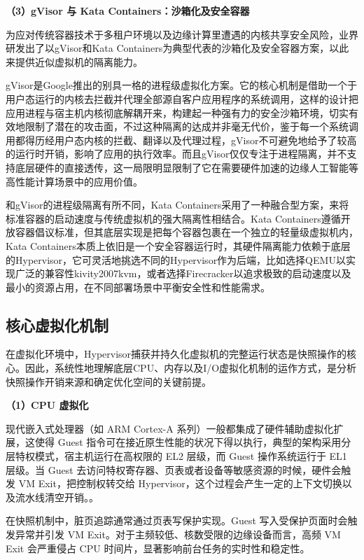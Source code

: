 \textbf{（3）gVisor 与 Kata Containers：沙箱化及安全容器}

为应对传统容器技术于多租户环境以及边缘计算里遭遇的内核共享安全风险，业界研发出了以gVisor和Kata Containers为典型代表的沙箱化及安全容器方案，以此来提供近似虚拟机的隔离能力\cite{pahl2015containers}。

gVisor是Google推出的别具一格的进程级虚拟化方案。它的核心机制是借助一个于用户态运行的内核去拦截并代理全部源自客户应用程序的系统调用，这样的设计把应用进程与宿主机内核彻底解耦开来，构建起一种强有力的安全沙箱环境，切实有效地限制了潜在的攻击面\cite{gvisor_usenix}，不过这种隔离的达成并非毫无代价，鉴于每一个系统调用都得历经用户态内核的拦截、翻译以及代理过程，gVisor不可避免地给予了较高的运行时开销，影响了应用的执行效率\cite{felter2015containers}。而且gVisor仅仅专注于进程隔离，并不支持底层硬件的直接透传，这一局限明显限制了它在需要硬件加速的边缘人工智能等高性能计算场景中的应用价值\cite{gvisor_limitation}。

和gVisor的进程级隔离有所不同，Kata Containers采用了一种融合型方案，来将标准容器的启动速度与传统虚拟机的强大隔离性相结合\cite{katacontainers_paper}。Kata Containers遵循开放容器倡议标准，但其底层实现是把每个容器包裹在一个独立的轻量级虚拟机内，Kata Containers本质上依旧是一个安全容器运行时，其硬件隔离能力依赖于底层的Hypervisor，它可灵活地挑选不同的Hypervisor作为后端，比如选择QEMU以实现广泛的兼容性{kivity2007kvm}，或者选择Firecracker以追求极致的启动速度以及最小的资源占用\cite{agache2020firecracker}，在不同部署场景中平衡安全性和性能需求。

\subsection{核心虚拟化机制}

在虚拟化环境中，Hypervisor捕获并持久化虚拟机的完整运行状态是快照操作的核心。因此，系统性地理解底层CPU、内存以及I/O虚拟化机制的运作方式，是分析快照操作开销来源和确定优化空间的关键前提。

\textbf{（1）CPU 虚拟化}

现代嵌入式处理器（如 ARM Cortex-A 系列）一般都集成了硬件辅助虚拟化扩展，这使得 Guest 指令可在接近原生性能的状况下得以执行，典型的架构采用分层特权模式，宿主机运行在高权限的 EL2 层级，而 Guest 操作系统运行于 EL1 层级。当 Guest 去访问特权寄存器、页表或者设备等敏感资源的时候，硬件会触发 VM Exit，把控制权转交给 Hypervisor，这个过程会产生一定的上下文切换以及流水线清空开销。\cite{popek1974formal}。

在快照机制中，脏页追踪通常通过页表写保护实现。Guest 写入受保护页面时会触发异常并引发 VM Exit。对于主频较低、核数受限的边缘设备而言，高频 VM Exit 会严重侵占 CPU 时间片，显著影响前台任务的实时性和稳定性\cite{wang2014vm}。

